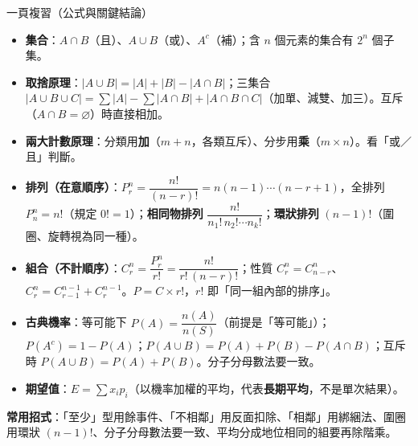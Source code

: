 \documentclass[11pt]{article}
\begin{document}
\begin{補充框}{一頁複習（公式與關鍵結論）}
\begin{itemize}\setlength{\itemsep}{2pt}
\item \textbf{集合}：$A\cap B$（且）、$A\cup B$（或）、$A^c$（補）；含 $n$ 個元素的集合有 $2^n$ 個子集。
\item \textbf{取捨原理}：$|A\cup B|=|A|+|B|-|A\cap B|$；三集合 $|A\cup B\cup C|=\sum|A|-\sum|A\cap B|+|A\cap B\cap C|$（加單、減雙、加三）。互斥（$A\cap B=\varnothing$）時直接相加。
\item \textbf{兩大計數原理}：分類用\textbf{加}（$m+n$，各類互斥）、分步用\textbf{乘}（$m\times n$）。看「或／且」判斷。
\item \textbf{排列（在意順序）}：$P^n_r=\dfrac{n!}{(n-r)!}=n(n-1)\cdots(n-r+1)$，全排列 $P^n_n=n!$（規定 $0!=1$）；\textbf{相同物排列} $\dfrac{n!}{n_1!\,n_2!\cdots n_k!}$；\textbf{環狀排列} $(n-1)!$（圍圈、旋轉視為同一種）。
\item \textbf{組合（不計順序）}：$C^n_r=\dfrac{P^n_r}{r!}=\dfrac{n!}{r!\,(n-r)!}$；性質 $C^n_r=C^n_{n-r}$、$C^n_r=C^{n-1}_{r-1}+C^{n-1}_r$。$P=C\times r!$，$r!$ 即「同一組內部的排序」。
\item \textbf{古典機率}：等可能下 $P(A)=\dfrac{n(A)}{n(S)}$（前提是「等可能」）；$P(A^c)=1-P(A)$；$P(A\cup B)=P(A)+P(B)-P(A\cap B)$；互斥時 $P(A\cup B)=P(A)+P(B)$。分子分母數法要一致。
\item \textbf{期望值}：$E=\sum x_i p_i$（以機率加權的平均，代表\textbf{長期平均}，不是單次結果）。
\end{itemize}
\textbf{常用招式}：「至少」型用餘事件、「不相鄰」用反面扣除、「相鄰」用綁綑法、圍圈用環狀 $(n-1)!$、分子分母數法要一致、平均分成地位相同的組要再除階乘。
\end{補充框}
\end{document}
